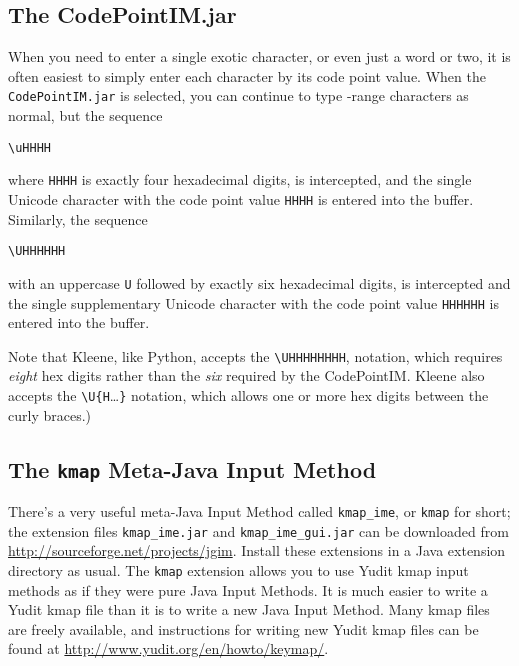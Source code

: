 \subsection{The CodePointIM.jar}

When you need to enter a single exotic character, or even just a word or
two, it is often easiest to simply enter each character by its code point
value.  When the \texttt{CodePointIM.jar} is selected, you can continue
to type -range characters as normal, but the sequence 

\begin{Verbatim}
\uHHHH
\end{Verbatim}

\noindent
where
\texttt{HHHH} is exactly four hexadecimal digits, is intercepted,
and the single Unicode character with the code point
value \texttt{HHHH} is entered into the buffer.  Similarly, the sequence 

\begin{Verbatim}
\UHHHHHH
\end{Verbatim}

\noindent
with an uppercase \texttt{U} followed by exactly six hexadecimal digits,
is intercepted and the single supplementary Unicode character with the
code point value \texttt{HHHHHH} is entered into the buffer.

Note that Kleene, like Python, accepts the \verb!\UHHHHHHHH!, notation,
which requires \emph{eight} hex digits rather than the \emph{six}
required by the CodePointIM.  Kleene also accepts the
\verb!\U{H!\ldots\verb!}! notation, which allows one or more hex digits
between the curly braces.)

\subsection{The \texttt{kmap} Meta-Java Input Method}

There's a very useful meta-Java Input Method called \texttt{kmap\_ime},
or \texttt{kmap} for short; the extension files \texttt{kmap\_ime.jar}
and \texttt{kmap\_ime\_gui.jar} can be downloaded from
\url{http://sourceforge.net/projects/jgim}.  Install these extensions in
a Java extension directory as usual.  The \texttt{kmap} extension allows
you to use Yudit kmap input methods as if they were pure Java Input
Methods.  It is much easier to write a Yudit kmap file than it is to
write a new Java Input Method.  Many kmap files are freely available, and
instructions for writing new Yudit kmap files can be found at
\url{http://www.yudit.org/en/howto/keymap/}.

